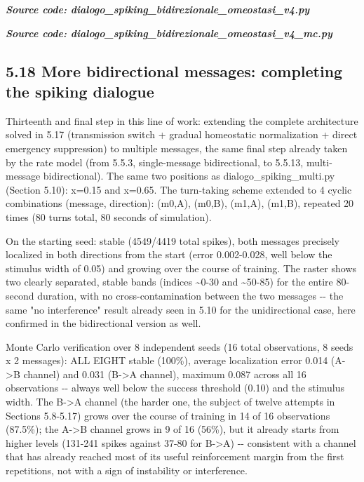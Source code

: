\documentclass[
  english,
]{article}
\begin{document}
\textit{\textbf{Source code: dialogo\_\allowbreak{}spiking\_\allowbreak{}bidirezionale\_\allowbreak{}omeostasi\_\allowbreak{}v4.py}}


\textit{\textbf{Source code: dialogo\_\allowbreak{}spiking\_\allowbreak{}bidirezionale\_\allowbreak{}omeostasi\_\allowbreak{}v4\_\allowbreak{}mc.py}}


\subsection{5.18 More bidirectional messages: completing the spiking dialogue}\label{more-bidirectional-messages-completing-the-spiking-dialogue}

Thirteenth and final step in this line of work: extending the complete architecture solved in 5.17 (transmission switch + gradual homeostatic normalization + direct emergency suppression) to multiple messages, the same final step already taken by the rate model (from 5.5.3, single-message bidirectional, to 5.5.13, multi-message bidirectional). The same two positions as dialogo\_\allowbreak{}spiking\_\allowbreak{}multi.py (Section 5.10): x=0.15 and x=0.65. The turn-taking scheme extended to 4 cyclic combinations (message, direction): (m0,A), (m0,B), (m1,A), (m1,B), repeated 20 times (80 turns total, 80 seconds of simulation).

On the starting seed: stable (4549/4419 total spikes), both messages precisely localized in both directions from the start (error 0.002-0.028, well below the stimulus width of 0.05) and growing over the course of training. The raster shows two clearly separated, stable bands (indices \textasciitilde0-30 and \textasciitilde50-85) for the entire 80-second duration, with no cross-contamination between the two messages -\/- the same "no interference" result already seen in 5.10 for the unidirectional case, here confirmed in the bidirectional version as well.

Monte Carlo verification over 8 independent seeds (16 total observations, 8 seeds x 2 messages): ALL EIGHT stable (100\%), average localization error 0.014 (A-\textgreater B channel) and 0.031 (B-\textgreater A channel), maximum 0.087 across all 16 observations -\/- always well below the success threshold (0.10) and the stimulus width. The B-\textgreater A channel (the harder one, the subject of twelve attempts in Sections 5.8-5.17) grows over the course of training in 14 of 16 observations (87.5\%); the A-\textgreater B channel grows in 9 of 16 (56\%), but it already starts from higher levels (131-241 spikes against 37-80 for B-\textgreater A) -\/- consistent with a channel that has already reached most of its useful reinforcement margin from the first repetitions, not with a sign of instability or interference.
\end{document}
